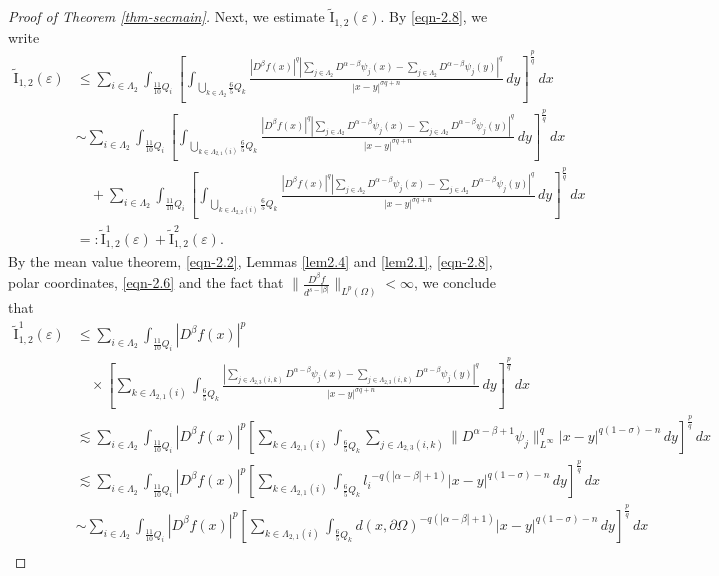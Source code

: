 \documentclass[11pt,twoside]{article}
\def\Qi{\frac{11}{10}Q_i}
\def\Qkk{\frac{6}{5}Q_k}
\def\az{\alpha}
\def\bz{\beta}
\def\boz{{\Omega}}
\def\sz{\sigma}
\def\vez{\varepsilon}
\def\pa{\partial}                %
\theoremstyle{mylem}
\theoremstyle{definition}
\numberwithin{equation}{section}
\begin{document}
\begin{proof}[Proof of Theorem \ref{thm-secmain}]
Next, we estimate \( \tilde{\mathrm{I}}_{1,2}(\vez) \). By \eqref{eqn-2.8}, we write
\begin{align*}
\tilde{\mathrm{I}}_{1,2}(\vez)
&\leq \sum_{i \in \Lambda_2} \int_{\Qi} \left[ \int_{\bigcup_{k \in \Lambda_2} \Qkk} \frac{|D^\beta f(x)|^q |\sum_{j\in\Lambda_2}D^{\alpha - \beta} \psi_j(x) - \sum_{j\in\Lambda_2}D^{\alpha - \beta} \psi_j(y)|^q}{|x - y|^{\sz q + n}}\,dy \right]^{\frac{p}{q}}\,dx  \nonumber \\
&\sim \sum_{i \in \Lambda_2} \int_{\Qi} \left[ \int_{\bigcup_{k \in \Lambda_{2,1}(i)} \Qkk} \frac{|D^\beta f(x)|^q |\sum_{j\in\Lambda_2}D^{\alpha - \beta} \psi_j(x) - \sum_{j\in\Lambda_2}D^{\alpha - \beta} \psi_j(y)|^q}{|x - y|^{\sz q + n}}\,dy \right]^{\frac{p}{q}}\,dx \nonumber \\
&\quad+ \sum_{i \in \Lambda_2} \int_{\Qi} \left[ \int_{\bigcup_{k \in \Lambda_{2,2}(i)} \Qkk} \frac{|D^\beta f(x)|^q |\sum_{j\in\Lambda_2}D^{\alpha - \beta} \psi_j(x) - \sum_{j\in\Lambda_2}D^{\alpha - \beta} \psi_j(y)|^q}{|x - y|^{\sz q + n}}\,dy \right]^{\frac{p}{q}}\,dx \nonumber \\
&=:\tilde{\mathrm{I}}_{1,2}^1(\vez) + \tilde{\mathrm{I}}_{1,2}^2(\vez).
\end{align*}
By the mean value theorem, \eqref{eqn-2.2}, Lemmas \ref{lem2.4} and \ref{lem2.1}, \eqref{eqn-2.8}, polar coordinates, \eqref{eqn-2.6} and 
the fact
that $\|\frac{D^\beta f}{d^{s-|\beta|}}\|_{L^p(\Omega)}<\infty$, we conclude that
\begin{align}\label{eqn-4.29}
\tilde{\mathrm{I}}_{1,2}^1(\vez)
&\leq \sum_{i \in \Lambda_2} \int_{\Qi} |D^\bz f(x)|^p \nonumber\\
&\quad\times\left[ \sum_{k \in \Lambda_{2,1}(i)} \int_{\Qkk} \frac{|\sum_{j \in \Lambda_{2,3}(i,k)} D^{\alpha - \beta}\psi_j(x) -\sum_{j \in \Lambda_{2,3}(i,k)} D^{\alpha - \beta}\psi_j(y)|^q}{|x - y|^{\sz q + n}}\,dy \right]^{\frac{p}{q}}\,dx \nonumber \\
&\lesssim \sum_{i \in \Lambda_2} \int_{\Qi} |D^\bz f(x)|^p \left[ \sum_{k \in \Lambda_{2,1}(i)} \int_{\Qkk} \sum_{j \in \Lambda_{2,3}(i,k)}{\| D^{\az-\bz+1} \psi_j \|_{L^\infty}^q |x - y|^{q(1 - \sz)-n}}\,dy \right]^{\frac{p}{q}}\,dx  \nonumber \\
&\lesssim \sum_{i \in \Lambda_2} \int_{\Qi} |D^\bz f(x)|^p \left[ \sum_{k \in \Lambda_{2,1}(i)} \int_{\Qkk} {{l_i}^{-q(|\az-\bz|+1)} |x - y|^{q(1 - \sz)-n}}\,dy \right]^{\frac{p}{q}}\,dx \nonumber \\
&\sim \sum_{i \in \Lambda_2} \int_{\Qi} |D^\bz f(x)|^p \left[ \sum_{k \in \Lambda_{2,1}(i)} \int_{\Qkk} {{d(x,\pa\boz)}^{-q(|\az-\bz|+1)} |x - y|^{q(1 - \sz)-n}}\,dy \right]^{\frac{p}{q}}\,dx \nonumber \\

\end{align}
\end{proof}
\end{document}
